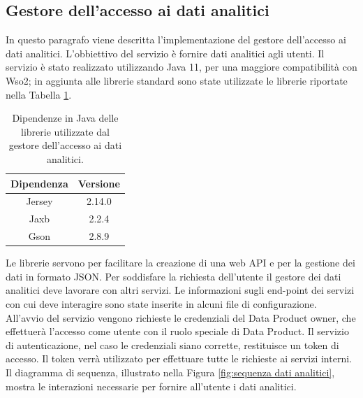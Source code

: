 \documentclass[a4paper,12pt]{report}
\begin{document}
\subsection{Gestore dell'accesso ai dati analitici}
In questo paragrafo viene descritta l'implementazione del gestore dell'accesso ai dati analitici.
L'obbiettivo del servizio è fornire dati analitici agli utenti.
Il servizio è stato realizzato utilizzando Java 11, per una maggiore compatibilità con Wso2; in aggiunta alle librerie standard sono state utilizzate le librerie riportate nella Tabella \ref{tab:dependencies}.
\begin{table}[H]
\centering
\begin{tabular}{|c|c|}
    \hline
    Dipendenza & Versione \\
    \hline
    Jersey & 2.14.0 \\
    Jaxb & 2.2.4 \\
    Gson & 2.8.9 \\
    \hline
\end{tabular}
\caption{Dipendenze in Java delle librerie utilizzate dal gestore dell'accesso ai dati analitici.}
\label{tab:dependencies}
\end{table}
Le librerie servono per facilitare la creazione di una web API e per la gestione dei dati in formato JSON.
Per soddisfare la richiesta dell'utente il gestore dei dati analitici deve lavorare con altri servizi.
Le informazioni sugli end-point dei servizi con cui deve interagire sono state inserite in alcuni file di configurazione.
All'avvio del servizio vengono richieste le credenziali del Data Product owner, che effettuerà l'accesso come utente con il ruolo speciale di Data Product.
Il servizio di autenticazione, nel caso le credenziali siano corrette, restituisce un token di accesso.
Il token verrà utilizzato per effettuare tutte le richieste ai servizi interni.
Il diagramma di sequenza, illustrato nella Figura \ref{fig:sequenza dati analitici}, mostra le interazioni necessarie per fornire all'utente i dati analitici.
\end{document}
